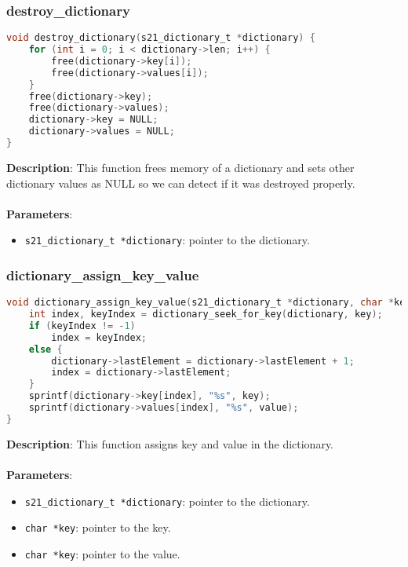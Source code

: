 \documentclass{article}
\begin{document}
\subsubsection{destroy\_dictionary}
\begin{lstlisting}[language=C]
void destroy_dictionary(s21_dictionary_t *dictionary) {
    for (int i = 0; i < dictionary->len; i++) {
        free(dictionary->key[i]);
        free(dictionary->values[i]);
    }
    free(dictionary->key);
    free(dictionary->values);
    dictionary->key = NULL;
    dictionary->values = NULL;
}
\end{lstlisting}
\noindent
\textbf{Description}: This function frees memory of a dictionary and sets other dictionary values as NULL so we can detect if it was destroyed properly.\\\\
\textbf{Parameters}:
\begin{itemize}
    \item \texttt{s21\_dictionary\_t *dictionary}: pointer to the dictionary.
\end{itemize}

\subsubsection{dictionary\_assign\_key\_value}
\begin{lstlisting}[language=C]
void dictionary_assign_key_value(s21_dictionary_t *dictionary, char *key, char *value) {
    int index, keyIndex = dictionary_seek_for_key(dictionary, key);
    if (keyIndex != -1)
        index = keyIndex;
    else {
        dictionary->lastElement = dictionary->lastElement + 1;
        index = dictionary->lastElement;
    }
    sprintf(dictionary->key[index], "%s", key);
    sprintf(dictionary->values[index], "%s", value);
}
\end{lstlisting}
\noindent
\textbf{Description}: This function assigns key and value in the dictionary.\\\\
\textbf{Parameters}:
\begin{itemize}
    \item \texttt{s21\_dictionary\_t *dictionary}: pointer to the dictionary.
    \item \texttt{char *key}: pointer to the key.
    \item \texttt{char *key}: pointer to the value.
\end{itemize}
\end{document}
